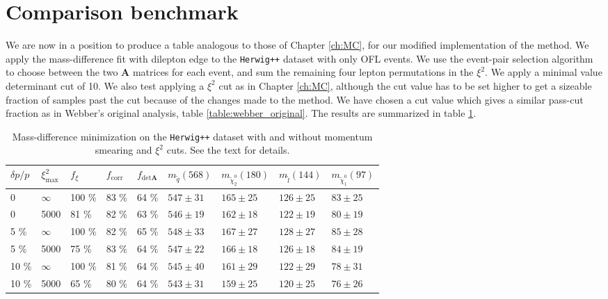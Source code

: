 \documentclass[twoside,english]{uiofysmaster}
\begin{document}
\section{Comparison benchmark}
We are now in a position to produce a table analogous to those of Chapter \ref{ch:MC}, for our modified implementation of the method. We apply the mass-difference fit with dilepton edge to the {\tt Herwig++} dataset with only OFL events. We use the event-pair selection algorithm to choose between the two $\mathbf{A}$ matrices for each event, and sum the remaining four lepton permutations in the $\xi^2$. We apply a minimal value determinant cut of 10. We also test applying a $\xi^2$ cut as in Chapter \ref{ch:MC}, although the cut value has to be set higher to get a sizeable fraction of samples past the cut because of the changes made to the method. We have chosen a cut value which gives a similar pass-cut fraction as in Webber's original analysis, table \ref{table:webber_original}. The results are summarized in table \ref{table:MD_fit_table}.
\begin{table}[hbt]
	\centering
	\begin{tabular}{| l | l | l | l | l  || l | l | l | l |}
		\hline
		$\delta p/p$ & $\xi^2_\mathrm{max}$ & $f_\xi$ & $f_\mathrm{corr}$ & $f_{\mathrm{det}\mathbf{A}}$ & $m_{\tilde q} (568)$ & $m_{\tilde \chi_2^0} (180)$ & $m_{\tilde l} (144)$ & $m_{\tilde \chi_1^0} (97)$ \\
		\hline \hline
		0 & 	$\infty$ &	100 \%	& 83 \%	& 64 \% & $547 \pm 31$	&	$165 \pm 25$	&	$126 \pm 25$	& 	$83 \pm 25$	\\
		0 &		5000 &		81 \%	& 82 \% & 63 \% & $546 \pm 19$	&	$162 \pm 18$	&	$122 \pm 19$	&	$80 \pm 19$	\\
		5 \% &	$\infty$ &	100 \%	& 82 \% & 65 \% & $548 \pm 33$	& 	$167 \pm 27$	&	$128 \pm 27$	&	$85 \pm 28$ \\
		5 \% &	5000 &		75 \%	& 83 \% & 64 \% & $547 \pm 22$	&	$166 \pm 18$	& 	$126 \pm 18$	&	$84 \pm 19$	\\
		10 \% &	$\infty$ &	100 \%	& 81 \% & 64 \% & $545 \pm 40$	&	$161 \pm 29$	&	$122 \pm 29$	&	$78 \pm 31$	\\
		10 \% &	5000 &		65 \%	& 80 \% & 64 \% & $543 \pm 31$	& 	$159 \pm 25$	&	$120 \pm 25$	&	$76 \pm 26$ \\
		\hline
	\end{tabular}
	\caption{Mass-difference minimization on the {\tt Herwig++} dataset with and without momentum smearing and $\xi^2$ cuts. See the text for details.}
	\label{table:MD_fit_table}
\end{table}
\end{document}
